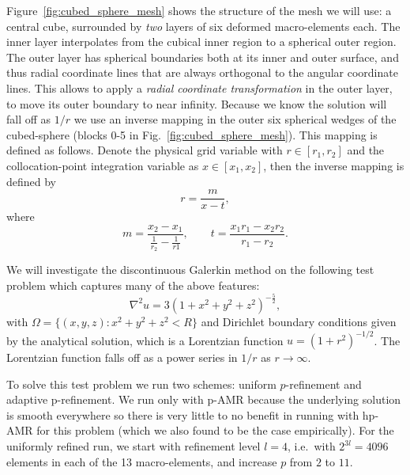 Figure~\ref{fig:cubed_sphere_mesh} shows the structure of the mesh we
will use: a central cube, surrounded by \emph{two} layers of six
deformed macro-elements each.  The inner layer interpolates from the
cubical inner region to a spherical outer region.  The outer layer has
spherical boundaries both at its inner and outer surface, and thus
radial coordinate lines that are always orthogonal to the angular
coordinate lines.  This allows to apply a \textit{radial coordinate
  transformation} in the outer layer, to move its outer boundary to
near infinity. Because we know the solution will fall off as $1/r$ we
use an inverse mapping in the outer six spherical wedges of the
cubed-sphere (blocks 0-5 in Fig.~\ref{fig:cubed_sphere_mesh}). This
mapping is defined as follows. Denote the physical grid variable with
$r\in[r_1,r_2]$ and the collocation-point integration variable as
$x\in[x_1,x_2]$, then the inverse mapping is defined by
%
\begin{equation}
  \label{eqn:inverse_mapping}
  r = \frac{m}{x-t},
\end{equation}
%
where
%
\begin{equation}
  m = \frac{x_2-x_1}{\frac{1}{r_2} -\frac{1}{r1}},\qquad
  t = \frac{x_1r_1-x_2r_2}{r_1 - r_2}.
\end{equation}

We will investigate the discontinuous Galerkin method on
the following test problem which captures many of the above features:
%
\begin{equation}\label{eq:Lorentzian}
\nabla^2 u = 3 (1 + x^2 + y^2 + z^2)^{-\frac{5}{2}},
\end{equation}
%
with $\Omega = \{(x,y,z) : x^2 + y^2 + z^2 < R\}$ and Dirichlet
boundary conditions given by the analytical solution, which is a
Lorentzian function $u = (1 + r^2)^{-1/2}$. The Lorentzian function
falls off as a power series in $1/r$ as $r \rightarrow \infty$.

To solve this test problem we run two schemes: uniform $p$-refinement
and adaptive p-refinement.
We run only with p-AMR because the underlying
solution is smooth everywhere so there is very little to no benefit in
running with hp-AMR for this problem (which we also found to be the
case empirically).
For the uniformly refined run, we start with refinement level $l=4$, i.e.\ with $2^{3l}=4096$ elements in each of the 13 macro-elements, and increase $p$ from $2$ to $11$.

